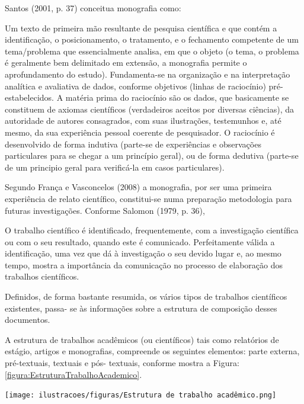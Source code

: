 \begin{Desenvolvimento}
Santos (2001, p. 37) conceitua monografia como:
\begin{citacaodireta}
Um texto de primeira mão resultante de pesquisa científica e que contém a identificação, o posicionamento, o tratamento, e o fechamento competente de um tema/problema que essencialmente analisa, em que o objeto (o tema, o problema é geralmente bem delimitado em extensão, a monografia permite o aprofundamento do estudo). Fundamenta-se na organização e na interpretação analítica e avaliativa de dados, conforme objetivos (linhas de raciocínio) pré-estabelecidos. A matéria prima do raciocínio são os dados, que basicamente se constituem de axiomas científicos (verdadeiros aceitos por diversas ciências), da autoridade de autores consagrados, com suas ilustrações, testemunhos e, até mesmo, da sua experiência pessoal coerente de pesquisador. O raciocínio é desenvolvido de forma indutiva (parte-se de experiências e observações particulares para se chegar a um princípio geral), ou de forma dedutiva (parte-se de um principio geral para verificá-la em casos particulares).
\end{citacaodireta}

Segundo França e Vasconcelos (2008) a monografia, por ser uma primeira experiência de relato científico, constitui-se numa preparação metodologia para futuras investigações. Conforme Salomon (1979, p. 36),

\begin{citacaodireta}
O trabalho científico é identificado, frequentemente, com a investigação científica ou com o seu resultado, quando este é comunicado. Perfeitamente válida a identificação, uma vez que dá à investigação o seu devido lugar e, ao mesmo tempo, mostra a importância da comunicação no processo de elaboração dos trabalhos científicos.
\end{citacaodireta}

Definidos, de forma bastante resumida, os vários tipos de trabalhos científicos existentes, passa- se às informações sobre a estrutura de composição desses documentos.

A estrutura de trabalhos acadêmicos (ou científicos) tais como relatórios de estágio, artigos e monografias, compreende os seguintes elementos: parte externa, pré-textuais, textuais e pós- textuais, conforme mostra a Figura: \ref{figura:EstruturaTrabalhoAcademico}.

\begin{figura}[h!]
  \centering
  \addfigura
  \texttt{[image: ilustracoes/figuras/Estrutura de trabalho acadêmico.png]}
  \label{figura:EstruturaTrabalhoAcademico}
\end{figura}


\end{Desenvolvimento}

